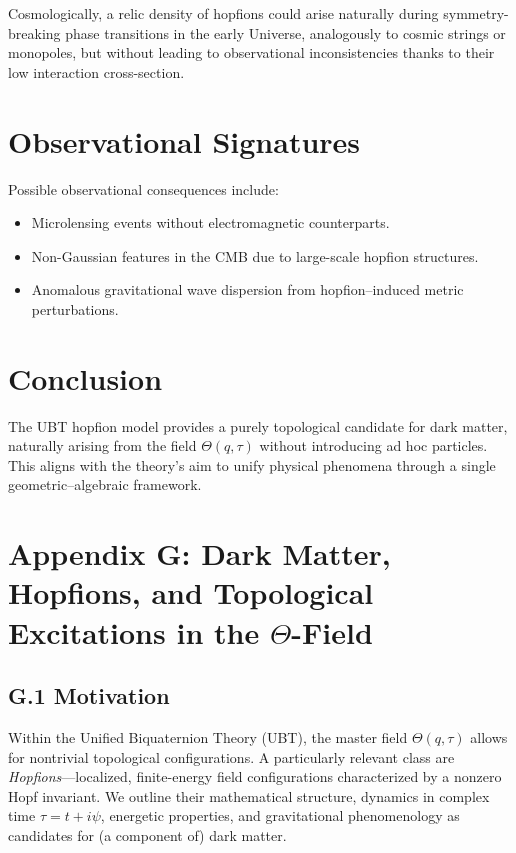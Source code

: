 Cosmologically, a relic density of hopfions could arise naturally during symmetry-breaking phase transitions in the early Universe, analogously to cosmic strings or monopoles, but without leading to observational inconsistencies thanks to their low interaction cross-section.

\section*{Observational Signatures}
Possible observational consequences include:
\begin{itemize}
\item Microlensing events without electromagnetic counterparts.
\item Non-Gaussian features in the CMB due to large-scale hopfion structures.
\item Anomalous gravitational wave dispersion from hopfion–induced metric perturbations.
\end{itemize}

\section*{Conclusion}
The UBT hopfion model provides a purely topological candidate for dark matter, naturally arising from the field \(\Theta(q,\tau)\) without introducing ad hoc particles. This aligns with the theory’s aim to unify physical phenomena through a single geometric–algebraic framework.

\section{Appendix G: Dark Matter, Hopfions, and Topological Excitations in the $\Theta$-Field}
\subsection*{G.1 Motivation}
Within the Unified Biquaternion Theory (UBT), the master field $\Theta(q,\tau)$ allows for nontrivial topological configurations. 
A particularly relevant class are \emph{Hopfions}---localized, finite-energy field configurations characterized by a nonzero Hopf invariant. 
We outline their mathematical structure, dynamics in complex time $\tau=t+i\psi$, energetic properties, and gravitational phenomenology as candidates for (a component of) dark matter.
